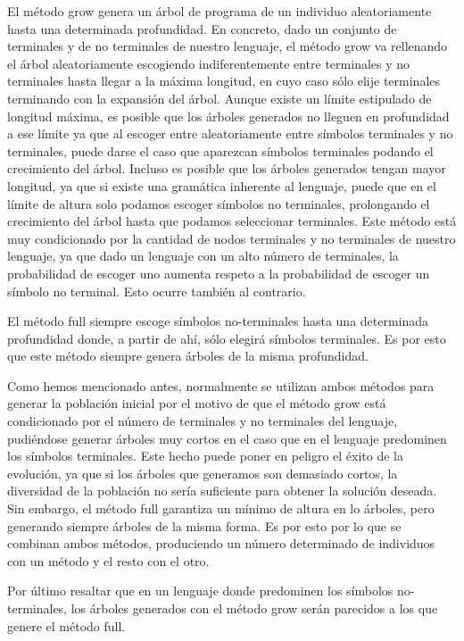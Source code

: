 El método grow genera un árbol de programa de un individuo aleatoriamente hasta
una determinada profundidad. En concreto, dado un conjunto de terminales  y de no
terminales de nuestro lenguaje, el método grow va rellenando el árbol
aleatoriamente escogiendo indiferentemente entre terminales y no terminales hasta
llegar a la máxima longitud, en cuyo caso sólo elije terminales terminando con la
expansión del árbol. Aunque existe un límite estipulado de longitud máxima, es
posible que los árboles generados no lleguen en profundidad a ese límite ya que
al escoger entre aleatoriamente entre símbolos terminales y no terminales, puede
darse el caso que aparezcan símbolos terminales podando el crecimiento del árbol.
Incluso es posible que los árboles generados tengan mayor longitud, ya que si
existe una gramática inherente al lenguaje, puede que en el límite de altura solo
podamos escoger símbolos no terminales, prolongando el crecimiento del árbol
hasta que podamos seleccionar terminales. Este método está muy condicionado por
la cantidad de nodos terminales y no terminales de nuestro lenguaje, ya que dado
un lenguaje con un alto número de terminales, la probabilidad de escoger uno
aumenta respeto a la probabilidad de escoger un símbolo no terminal. Esto ocurre
también al contrario.

El método full siempre escoge símbolos no-terminales hasta una determinada
profundidad donde, a partir de ahí, sólo elegirá símbolos terminales. Es por esto
que este método siempre genera árboles de la misma profundidad.
 
Como hemos mencionado antes, normalmente se utilizan ambos métodos para generar
la población inicial por el motivo de que el método grow está condicionado por el
número de terminales y no terminales del lenguaje, pudiéndose generar árboles muy
cortos en el caso que en el lenguaje predominen los símbolos terminales. Este
hecho puede poner en peligro el éxito de la evolución, ya que si los árboles que
generamos son demasiado cortos, la diversidad de la población no sería suficiente
para obtener la solución deseada. Sin embargo, el método full garantiza un mínimo
de altura en lo árboles, pero generando siempre árboles de la misma forma. Es por
esto por lo que se combinan ambos métodos, produciendo un número determinado de
individuos con un método y el resto con el otro.

Por último resaltar que en un lenguaje donde predominen los símbolos
no-terminales, los árboles generados con el método grow serán parecidos a los que
genere el método full.

